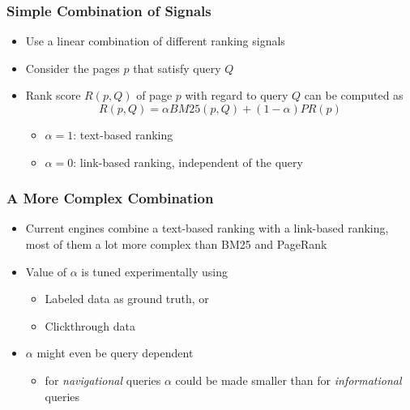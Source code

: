 \documentclass{beamer}
\begin{document}
\begin{frame}
    \frametitle{Simple Combination of Signals}
    \begin{itemize}
    \item Use a linear combination of different ranking signals
    \end{itemize}
    \begin{example}
        \begin{itemize}
        \item Consider the pages $p$ that satisfy query $Q$
        \item Rank score $R(p, Q)$ of page $p$ with regard to query $Q$ can be
            computed as
            \begin{displaymath}
                R(p,Q) = \alpha BM25(p,Q) + (1-\alpha) PR(p)
            \end{displaymath}
            \begin{itemize}
            \item $\alpha = 1$: text-based ranking
            \item $\alpha = 0$: link-based ranking, independent of the query
            \end{itemize}
        \end{itemize}
    \end{example}
\end{frame}

\begin{frame}
    \frametitle{A More Complex Combination}
    \begin{itemize}
    \item Current engines combine a text-based ranking with a link-based
        ranking, most of them a lot more complex than BM25 and PageRank
    \item Value of $\alpha$ is tuned experimentally using
        \begin{itemize}
        \item Labeled data as ground truth, or
        \item Clickthrough data
        \end{itemize}
    \item $\alpha$ might even be query dependent
        \begin{itemize}
        \item for \textit{navigational} queries $\alpha$ could be made smaller
            than for \textit{informational} queries
        \end{itemize}
    \end{itemize}
\end{frame}
\end{document}
